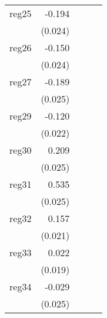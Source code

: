 {\begin{longtable}{l*{4}{D{.}{.}{-1}}}
\addlinespace
reg25       &      -0.194\sym{***}&                     &                     &                     \\
            &     (0.024)         &                     &                     &                     \\
\addlinespace
reg26       &      -0.150\sym{***}&                     &                     &                     \\
            &     (0.024)         &                     &                     &                     \\
\addlinespace
reg27       &      -0.189\sym{***}&                     &                     &                     \\
            &     (0.025)         &                     &                     &                     \\
\addlinespace
reg29       &      -0.120\sym{***}&                     &                     &                     \\
            &     (0.022)         &                     &                     &                     \\
\addlinespace
reg30       &       0.209\sym{***}&                     &                     &                     \\
            &     (0.025)         &                     &                     &                     \\
\addlinespace
reg31       &       0.535\sym{***}&                     &                     &                     \\
            &     (0.025)         &                     &                     &                     \\
\addlinespace
reg32       &       0.157\sym{***}&                     &                     &                     \\
            &     (0.021)         &                     &                     &                     \\
\addlinespace
reg33       &       0.022         &                     &                     &                     \\
            &     (0.019)         &                     &                     &                     \\
\addlinespace
reg34       &      -0.029         &                     &                     &                     \\
            &     (0.025)         &                     &                     &                     \\

\end{longtable}}
